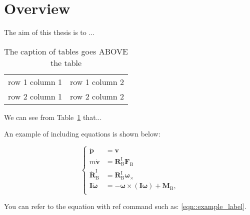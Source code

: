 \section{Overview}
\label{sec::overview}
The aim of this thesis is to ...

\begin{table}[!htbp]
    \centering
    \caption{The caption of tables goes ABOVE the table}
    \begin{tabular}{c|c}
         row 1 column 1 & row 1 column 2  \\
         row 2 column 1 & row 2 column 2 
    \end{tabular}
    
    \label{tab::table_template}
\end{table}

We can see from Table~\ref{tab::table_template} that...

An example of including equations is shown below:

\begin{equation}
	\label{eqn::example_label}
        \left\{
	\begin{aligned}
		\dot{\mathbf{p}}&=\mathbf{v}\\
		m\dot{\mathbf{v}}&=\mathbf{R}_\text{B}^\text{I}\mathbf{F}_\text{B}\\            \dot{\mathbf{R}}_\text{B}^\text{I}&=\mathbf{R}_\text{B}^\text{I}\boldsymbol{\omega}_{\times}\\
            \mathbf{I}\dot{\boldsymbol{\omega}}&=-\boldsymbol{\omega}\times(\mathbf{I}\boldsymbol{\omega})+\mathbf{M}_\text{B},\\
	\end{aligned}
        \right.
\end{equation}

You can refer to the equation with ref command such as: \ref{eqn::example_label}.